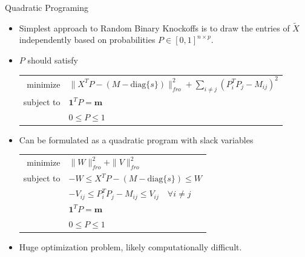 \documentclass{beamer}
\newcommand{\diag}[1]{\mathrm{diag}\{#1\}}
\begin{document}
\begin{frame}{Quadratic Programing}
    \begin{itemize} 
        \item Simplest approach to Random Binary Knockoffs is to draw the entries of $\tilde X$ independently based on probabilities $P\in[0,1]^{n\times p}$.
        \item $P$ should satisfy 
            \begin{center}
                \begin{tabular}{r l}
                    minimize     & $\|X^TP-(M-\diag{s})\|_{fro}^2 + \sum_{i\neq j}(P_i^T P_j - M_{ij})^2 $\\
                    subject to   & $ \mathbf 1^T P = \mathbf m $ \\
                                 & $0 \leq P \leq 1$
                \end{tabular} 
            \end{center}
        \item Can be formulated as a quadratic program with slack variables
            \begin{center}
                \begin{tabular}{r l}
                    minimize     & $\|W\|_{fro}^2 + \|V\|_{fro}^2 $ \\
                    subject to   & $ -W \leq X^TP-(M-\diag{s})\leq W $ \\
                                 & $ -V_{ij} \leq P_i^T P_j - M_{ij} \leq V_{ij} \quad \forall i\neq j$ \\
                                 & $ \mathbf 1^T P = \mathbf m $ \\
                                 & $0 \leq P \leq 1$
                \end{tabular} 
            \end{center}
        \item Huge optimization problem, likely computationally difficult.
    \end{itemize}
\end{frame}
\end{document}
